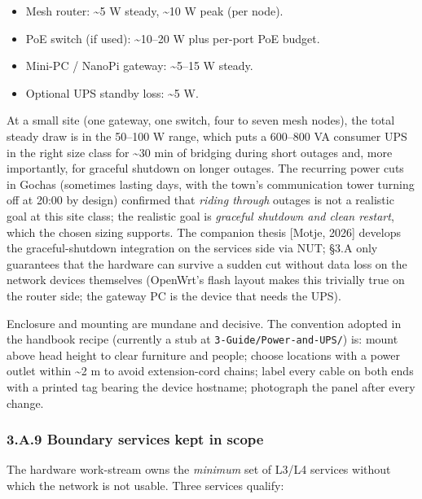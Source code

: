 \begin{itemize}
\tightlist
\item
  Mesh router: \textasciitilde5 W steady, \textasciitilde10 W peak (per
  node).
\item
  PoE switch (if used): \textasciitilde10--20 W plus per-port PoE
  budget.
\item
  Mini-PC / NanoPi gateway: \textasciitilde5--15 W steady.
\item
  Optional UPS standby loss: \textasciitilde5 W.
\end{itemize}

At a small site (one gateway, one switch, four to seven mesh nodes), the
total steady draw is in the 50--100 W range, which puts a 600--800 VA
consumer UPS in the right size class for \textasciitilde30 min of
bridging during short outages and, more importantly, for graceful
shutdown on longer outages. The recurring power cuts in Gochas
(sometimes lasting days, with the town's communication tower turning off
at 20:00 by design) confirmed that \emph{riding through} outages is not
a realistic goal at this site class; the realistic goal is
\emph{graceful shutdown and clean restart}, which the chosen sizing
supports. The companion thesis {[}Motje, 2026{]} develops the
graceful-shutdown integration on the services side via NUT; §3.A only
guarantees that the hardware can survive a sudden cut without data loss
on the network devices themselves (OpenWrt's flash layout makes this
trivially true on the router side; the gateway PC is the device that
needs the UPS).

Enclosure and mounting are mundane and decisive. The convention adopted
in the handbook recipe (currently a stub at
\texttt{3-Guide/Power-and-UPS/}) is: mount above head height to clear
furniture and people; choose locations with a power outlet within
\textasciitilde2 m to avoid extension-cord chains; label every cable on
both ends with a printed tag bearing the device hostname; photograph the
panel after every change.

\hypertarget{a.9-boundary-services-kept-in-scope}{%
\subsubsection{3.A.9 Boundary services kept in
scope}\label{a.9-boundary-services-kept-in-scope}}

The hardware work-stream owns the \emph{minimum} set of L3/L4 services
without which the network is not usable. Three services qualify:

